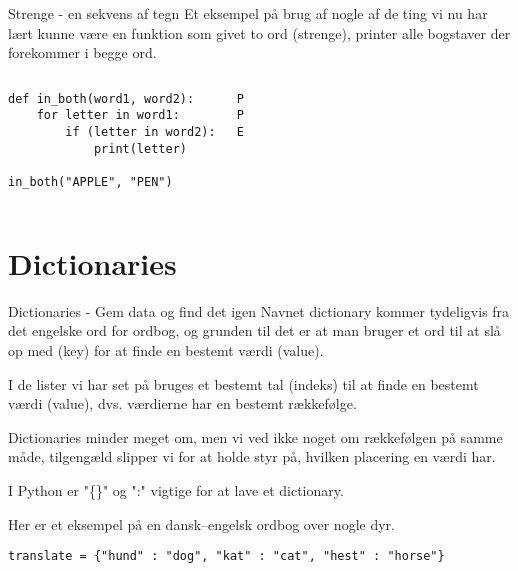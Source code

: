 \documentclass[main.tex]{subfiles}
\begin{document}
\begin{frame}[fragile]{Strenge - en sekvens af tegn}
	Et eksempel på brug af nogle af de ting vi nu har lært kunne være en funktion som givet to ord (strenge), printer alle bogstaver der forekommer i begge ord.
	\begin{columns}
		\begin{lstlisting}[style=python]
def in_both(word1, word2):
    for letter in word1:
        if (letter in word2):
            print(letter)
            
in_both("APPLE", "PEN")
		\end{lstlisting}

		\pause
		\begin{lstlisting}[style=python]
P
P
E
		\end{lstlisting}
	\end{columns}
\end{frame}

\section{Dictionaries}

\begin{frame}[fragile]{Dictionaries - Gem data og find det igen}
	Navnet dictionary kommer tydeligvis fra det engelske ord for ordbog, og grunden til det er at man bruger et ord til at slå op med (key) for at finde en bestemt værdi (value). 
	
	\pause
	
	I de lister vi har set på bruges et bestemt tal (indeks) til at finde en bestemt værdi (value), dvs. værdierne har en bestemt rækkefølge.
	
	\pause
	
	Dictionaries minder meget om, men vi ved ikke noget om rækkefølgen på samme måde, tilgengæld slipper vi for at holde styr på, hvilken placering en værdi har.
	\pause
	
	I Python er "\{\}" og ":" vigtige for at lave et dictionary.
	
	Her er et eksempel på en dansk--engelsk ordbog over nogle dyr.
	\begin{lstlisting}[style=python]
translate = {"hund" : "dog", "kat" : "cat", "hest" : "horse"}
	\end{lstlisting}
\end{frame}
\end{document}
